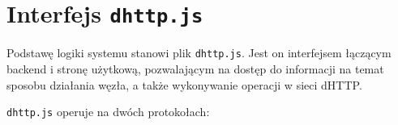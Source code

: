 





\section{Interfejs \texttt{dhttp.js}}

Podstawę logiki systemu stanowi plik \texttt{dhttp.js}. Jest on interfejsem łączącym backend i stronę użytkową, pozwalającym na dostęp do informacji na temat sposobu działania węzła, a także wykonywanie operacji w sieci dHTTP.

\texttt{dhttp.js} operuje na dwóch protokołach:

